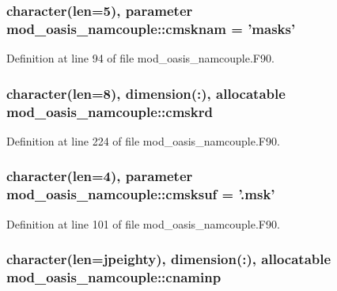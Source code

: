\hypertarget{classmod__oasis__namcouple_aeeda85bec8a449e87411d4ed404322c5}{
\subsubsection[{cmsknam}]{\setlength{\rightskip}{0pt plus 5cm}character(len=5), parameter mod\+\_\+oasis\+\_\+namcouple\+::cmsknam = 'masks'\hspace{0.3cm}{\ttfamily [private]}}}\label{classmod__oasis__namcouple_aeeda85bec8a449e87411d4ed404322c5}


Definition at line 94 of file mod\+\_\+oasis\+\_\+namcouple.\+F90.

\hypertarget{classmod__oasis__namcouple_a28c3f9e076a686c8ef916221e8fe4e10}{
\subsubsection[{cmskrd}]{\setlength{\rightskip}{0pt plus 5cm}character(len=8), dimension(\+:), allocatable mod\+\_\+oasis\+\_\+namcouple\+::cmskrd\hspace{0.3cm}{\ttfamily [private]}}}\label{classmod__oasis__namcouple_a28c3f9e076a686c8ef916221e8fe4e10}


Definition at line 224 of file mod\+\_\+oasis\+\_\+namcouple.\+F90.

\hypertarget{classmod__oasis__namcouple_aeea3ba680d5ba05a432c12d64c68c8af}{
\subsubsection[{cmsksuf}]{\setlength{\rightskip}{0pt plus 5cm}character(len=4), parameter mod\+\_\+oasis\+\_\+namcouple\+::cmsksuf = '.msk'\hspace{0.3cm}{\ttfamily [private]}}}\label{classmod__oasis__namcouple_aeea3ba680d5ba05a432c12d64c68c8af}


Definition at line 101 of file mod\+\_\+oasis\+\_\+namcouple.\+F90.

\hypertarget{classmod__oasis__namcouple_a1f6ff08cee0c3c5deb262c1447d88328}{
\subsubsection[{cnaminp}]{\setlength{\rightskip}{0pt plus 5cm}character(len={\bf jpeighty}), dimension(\+:), allocatable mod\+\_\+oasis\+\_\+namcouple\+::cnaminp\hspace{0.3cm}{\ttfamily [private]}}}\label{classmod__oasis__namcouple_a1f6ff08cee0c3c5deb262c1447d88328}


